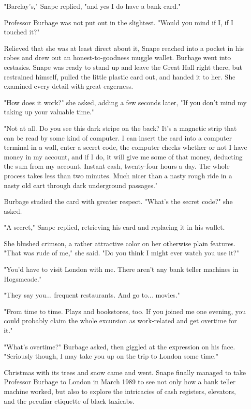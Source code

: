 "Barclay's," Snape replied, "and yes I do have a bank card."

Professor Burbage was not put out in the slightest. "Would you mind if I, if I touched it?"

Relieved that she was at least direct about it, Snape reached into a pocket in his robes and drew out an honest-to-goodness muggle wallet. Burbage went into ecstasies. Snape was ready to stand up and leave the Great Hall right there, but restrained himself, pulled the little plastic card out, and handed it to her. She examined every detail with great eagerness.

"How does it work?" she asked, adding a few seconds later, "If you don't mind my taking up your valuable time."

"Not at all. Do you see this dark stripe on the back? It's a magnetic strip that can be read by some kind of computer. I can insert the card into a computer terminal in a wall, enter a secret code, the computer checks whether or not I have money in my account, and if I do, it will give me some of that money, deducting the sum from my account. Instant cash, twenty-four hours a day. The whole process takes less than two minutes. Much nicer than a nasty rough ride in a nasty old cart through dark underground passages."

Burbage studied the card with greater respect. "What's the secret code?" she asked.

"A secret," Snape replied, retrieving his card and replacing it in his wallet.

She blushed crimson, a rather attractive color on her otherwise plain features. "That was rude of me," she said. "Do you think I might ever watch you use it?"

"You'd have to visit London with me. There aren't any bank teller machines in Hogsmeade."

"They say you... frequent restaurants. And go to... movies."

"From time to time. Plays and bookstores, too. If you joined me one evening, you could probably claim the whole excursion as work-related and get overtime for it."

"What's overtime?" Burbage asked, then giggled at the expression on his face. "Seriously though, I may take you up on the trip to London some time."

Christmas with its trees and snow came and went. Snape finally managed to take Professor Burbage to London in March 1989 to see not only how a bank teller machine worked, but also to explore the intricacies of cash registers, elevators, and the peculiar etiquette of black taxicabs.

